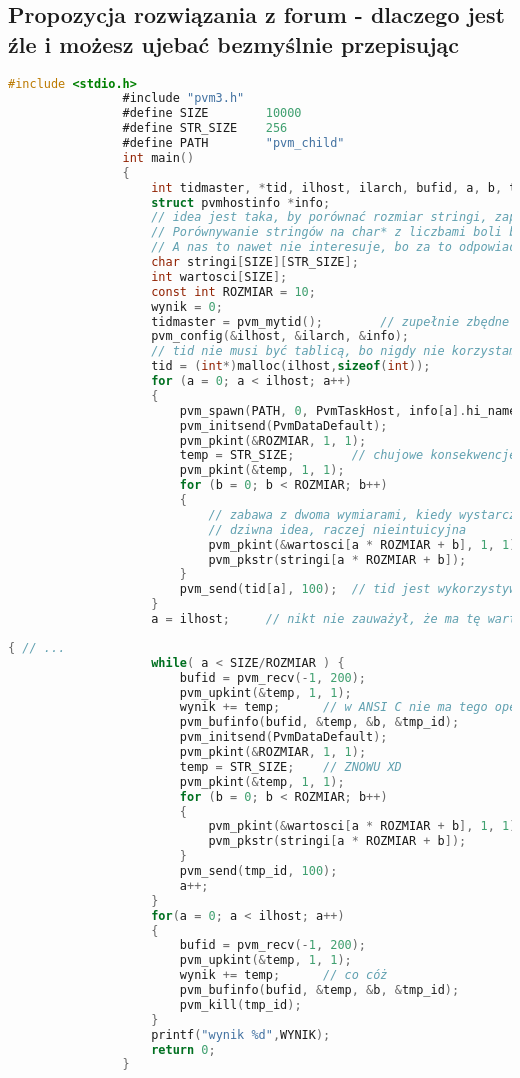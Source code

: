 		\subsection{Propozycja rozwiązania z forum - dlaczego jest źle i możesz ujebać bezmyślnie przepisując}
			\begin{lstlisting}[language=C]
				#include <stdio.h>
				#include "pvm3.h"
				#define SIZE        10000
				#define STR_SIZE    256
				#define PATH        "pvm_child"
				int main()
				{
					int tidmaster, *tid, ilhost, ilarch, bufid, a, b, temp, wynik;
					struct pvmhostinfo *info;
					// idea jest taka, by porównać rozmiar stringi, zapisany w drugim wymiarze, z wartością w 'wartosci'. Treść zadania mówi o dwóch tabelach w jednym wymierze, więc średnie to.
					// Porównywanie stringów na char* z liczbami boli bez gotowych funkcji, co? :P
					// A nas to nawet nie interesuje, bo za to odpowiada potomek, zatem mamy przykład popieprzenia z poplątaniem XD
					char stringi[SIZE][STR_SIZE];
					int wartosci[SIZE];
					const int ROZMIAR = 10;
					wynik = 0;
					tidmaster = pvm_mytid();		// zupełnie zbędne
					pvm_config(&ilhost, &ilarch, &info);
					// tid nie musi być tablicą, bo nigdy nie korzystamy z innego, niż aktualnie wykorzystywany
					tid = (int*)malloc(ilhost,sizeof(int));
					for (a = 0; a < ilhost; a++)
					{
						pvm_spawn(PATH, 0, PvmTaskHost, info[a].hi_name, 1, &tid[a]);
						pvm_initsend(PvmDataDefault);
						pvm_pkint(&ROZMIAR, 1, 1);
						temp = STR_SIZE;		// chujowe konsekwencje trzymania stałej przez define - brak adresu, hłehłe
						pvm_pkint(&temp, 1, 1);
						for (b = 0; b < ROZMIAR; b++)
						{
							// zabawa z dwoma wymiarami, kiedy wystarczy jeden
							// dziwna idea, raczej nieintuicyjna
							pvm_pkint(&wartosci[a * ROZMIAR + b], 1, 1);
							pvm_pkstr(stringi[a * ROZMIAR + b]);
						}
						pvm_send(tid[a], 100);	// tid jest wykorzystywany tylko w tej pętli, tabela nie sensu
					}
					a = ilhost;		// nikt nie zauważył, że ma tę wartość po wyjściu z pętli?
			\end{lstlisting}
			\newpage
			\begin{lstlisting}[language=C]
				{ // ...
					while( a < SIZE/ROZMIAR ) {
						bufid = pvm_recv(-1, 200);
						pvm_upkint(&temp, 1, 1);
						wynik += temp;		// w ANSI C nie ma tego operatora
						pvm_bufinfo(bufid, &temp, &b, &tmp_id);
						pvm_initsend(PvmDataDefault);
						pvm_pkint(&ROZMIAR, 1, 1);
						temp = STR_SIZE;	// ZNOWU XD
						pvm_pkint(&temp, 1, 1);
						for (b = 0; b < ROZMIAR; b++)
						{
							pvm_pkint(&wartosci[a * ROZMIAR + b], 1, 1);
							pvm_pkstr(stringi[a * ROZMIAR + b]);
						}
						pvm_send(tmp_id, 100);
						a++;
					}
					for(a = 0; a < ilhost; a++)
					{
						bufid = pvm_recv(-1, 200);
						pvm_upkint(&temp, 1, 1);
						wynik += temp;		// co cóż
						pvm_bufinfo(bufid, &temp, &b, &tmp_id);
						pvm_kill(tmp_id);
					}
					printf("wynik %d",WYNIK);
					return 0;
				}
			\end{lstlisting}
		\newpage
